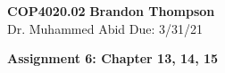 \noindent
\textbf{COP4020.02} \hfill \textbf{Brandon Thompson} \\
\normalsize Dr. Muhammed Abid \hfill Due: 3/31/21\\

\begin{center}
\textbf{Assignment 6: Chapter 13, 14, 15}
\end{center}
